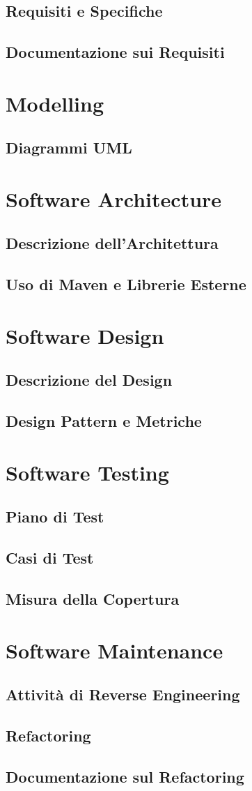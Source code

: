 \documentclass[a4paper,12pt]{article}
\begin{document}
\subsection{Requisiti e Specifiche}
\subsection{Documentazione sui Requisiti}

\section{Modelling}
\subsection{Diagrammi UML}

\section{Software Architecture}
\subsection{Descrizione dell'Architettura}
\subsection{Uso di Maven e Librerie Esterne}

\section{Software Design}
\subsection{Descrizione del Design}
\subsection{Design Pattern e Metriche}

\section{Software Testing}
\subsection{Piano di Test}
\subsection{Casi di Test}
\subsection{Misura della Copertura}

\section{Software Maintenance}
\subsection{Attività di Reverse Engineering}
\subsection{Refactoring}
\subsection{Documentazione sul Refactoring}
\end{document}
